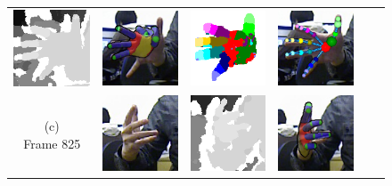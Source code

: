 \begin{figure}
\begin{tabular}{@{}cc@{}c@{}c@{}c@{}c@{}}
		\includegraphics[width=2.35cm]{fig/hand/qual/depth/image_0520.png} &
		\includegraphics[width=2.35cm]{fig/hand/qual/forth/image_0520.png} &
		\includegraphics[width=2.35cm]{fig/hand/qual/class/class-520.png} &
		\includegraphics[width=2.35cm]{fig/hand/qual/vote/image_0520.png}
		\label{fig/hand/multi2} \\
		\raisebox{1cm}{\parbox{2cm}{\centering (c)\\Frame 825}} & 
		\includegraphics[width=2.35cm]{fig/hand/qual/rgb/image_0825.png} &
		\includegraphics[width=2.35cm]{fig/hand/qual/depth/image_0825.png} &
		\includegraphics[width=2.35cm]{fig/hand/qual/forth/image_0825.png} &

\end{tabular}
\end{figure}

